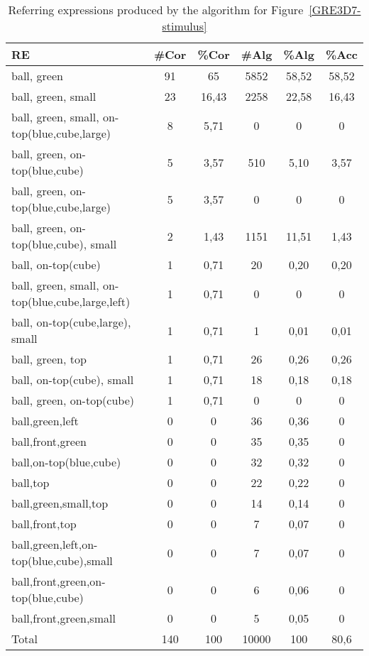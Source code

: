 \begin{table}
\begin{center}
\begin{tabular}{|l|c|c|c|c|c|}
\hline
RE & \#Cor & \%Cor & \#Alg & \%Alg & \%Acc \\
\hline
ball, green & 91 & 65 & 5852 &58,52 & 58,52 \\
ball, green, small & 23 & 16,43 & 2258 & 22,58 & 16,43 \\
ball, green, small, on-top(blue,cube,large) & 8 & 5,71 & 0 & 0 & 0 \\
ball, green, on-top(blue,cube) & 5 & 3,57 & 510 & 5,10 & 3,57 \\
ball, green, on-top(blue,cube,large) & 5 & 3,57 & 0 & 0 & 0 \\
ball, green, on-top(blue,cube), small & 2 & 1,43 & 1151 & 11,51 & 1,43 \\
ball, on-top(cube) & 1 & 0,71 & 20 & 0,20 & 0,20 \\
ball, green, small, on-top(blue,cube,large,left) & 1 & 0,71 & 0 & 0 & 0 \\
ball, on-top(cube,large), small	& 1 & 0,71 & 1 & 0,01 & 0,01 \\
ball, green, top & 1 & 0,71 &	26 & 0,26 & 0,26 \\
ball, on-top(cube), small & 1 & 0,71 & 18 & 0,18 & 0,18 \\
ball, green, on-top(cube) & 1 & 0,71 & 0 & 0 & 0 \\
ball,green,left	& 0 & 0 & 36 & 0,36 & 0 \\
ball,front,green & 0 & 0 & 35 & 0,35 & 0 \\
ball,on-top(blue,cube) & 0 & 0 & 32 & 0,32 & 0 \\
ball,top & 0 & 0 & 22 & 0,22 & 0 \\
ball,green,small,top & 0 & 0 & 14 & 0,14 & 0 \\
ball,front,top & 0 & 0 & 7 & 0,07 & 0 \\
ball,green,left,on-top(blue,cube),small & 0 &  0 & 7 & 0,07 & 0 \\
ball,front,green,on-top(blue,cube) & 0 & 0 & 6 & 0,06 & 0 \\
ball,front,green,small & 0 & 0 & 5 & 0,05 & 0 \\
\hline
Total & 140 & 100 & 10000 & 100 & 80,6 \\
\hline
\end{tabular}
\caption{Referring expressions produced by the algorithm for Figure~\ref{GRE3D7-stimulus}\label{results-algo-fig3}}
\end{center}
\end{table}

